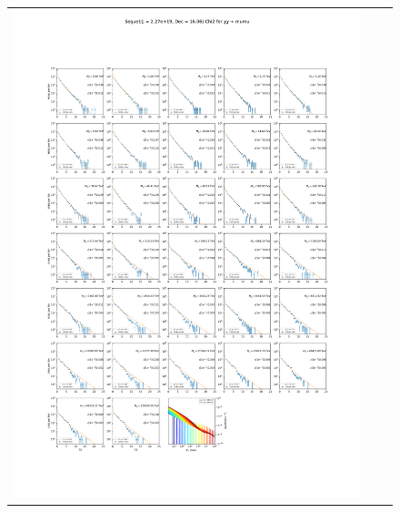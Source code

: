 \begin{figure}[!hb]
{\begin{tabular}{ccc}
            \includegraphics[clip, trim=22.1cm 6.5cm 19.5cm 56.5cm, scale=0.55]{figures/ic_DM/dm_plots/Segue1_mumu_chi2_Masspanel_2024-04-28.pdf} &

\end{tabular}}
\end{figure}

